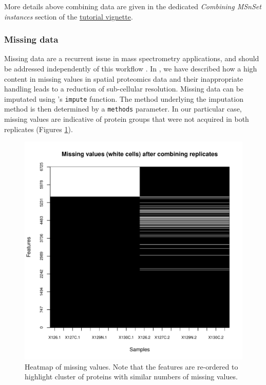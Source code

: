 More details above combining data are given in the dedicated
\textit{Combining MSnSet instances} section of the 
\href{http://bioconductor.org/packages/release/bioc/vignettes/MSnbase/inst/doc/MSnbase-demo.pdf}{tutorial
  vignette}.

\subsubsection*{Missing data}

Missing data are a recurrent issue in mass spectrometry applications,
and should be addressed independently of this workflow
\cite{Webb-Robertson:2015,Lazar:2016}. In \cite{Gatto:2014b}, we have
described how a high content in missing values in spatial proteomics
data and their inappropriate handling leads to a reduction of
sub-cellular resolution. Missing data can be imputated using
's \texttt{impute} function. The method underlying
the imputation method is then determined by a \texttt{methods}
parameter. In our particular case, missing values are indicative of
protein groups that were not acquired in both replicates (Figures
\ref{fig:namap}).

\begin{figure}[!ht]
  \centering
\begin{knitrout}
\color{fgcolor}\begin{kframe}
\begin{alltt}
\hlstd{(}  \hlstd{=} \hlstd{(}\hlstd{,} \hlstd{),}
        \hlstd{=} \hlstd{)}
\end{alltt}
\end{kframe}
\includegraphics[width=.65\textwidth]{figure/namap-1} 

\end{knitrout}
\caption{Heatmap of missing values. Note that the features are
  re-ordered to highlight cluster of proteins with similar numbers of
  missing values.}
  \label{fig:namap}
\end{figure}

